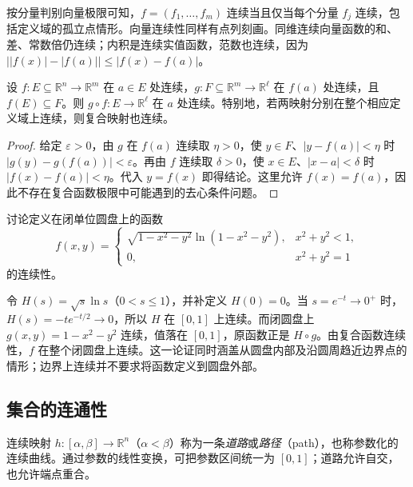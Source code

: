 按分量判别向量极限可知，$f=(f_1,\ldots,f_m)$ 连续当且仅当每个分量 $f_j$ 连续，包括定义域的孤立点情形。向量连续性同样有点列刻画。同维连续向量函数的和、差、常数倍仍连续；内积是连续实值函数，范数也连续，因为 $\bigl||f(x)|-|f(a)|\bigr|\leq|f(x)-f(a)|$。

\begin{theorem}[复合向量函数的连续性]
\label{thm:continuous-vector-function-composition}
设 $f:E\subseteq\mathbb R^n\to\mathbb R^m$ 在 $a\in E$ 处连续，$g:F\subseteq\mathbb R^m\to\mathbb R^\ell$ 在 $f(a)$ 处连续，且 $f(E)\subseteq F$。则 $g\circ f:E\to\mathbb R^\ell$ 在 $a$ 处连续。特别地，若两映射分别在整个相应定义域上连续，则复合映射也连续。
\end{theorem}

\begin{proof}
给定 $\varepsilon>0$，由 $g$ 在 $f(a)$ 连续取 $\eta>0$，使 $y\in F$、$|y-f(a)|<\eta$ 时 $|g(y)-g(f(a))|<\varepsilon$。再由 $f$ 连续取 $\delta>0$，使 $x\in E$、$|x-a|<\delta$ 时 $|f(x)-f(a)|<\eta$。代入 $y=f(x)$ 即得结论。这里允许 $f(x)=f(a)$，因此不存在复合函数极限中可能遇到的去心条件问题。
\end{proof}

\begin{example}
\label{ex:disk-logarithm-continuous-extension}
讨论定义在闭单位圆盘上的函数
\[
    f(x,y)=\begin{cases}
        \sqrt{1-x^2-y^2}\ln(1-x^2-y^2),&x^2+y^2<1,\\
        0,&x^2+y^2=1
    \end{cases}
\]
的连续性。
\end{example}

\begin{solve}
令 $H(s)=\sqrt s\ln s$（$0<s\leq1$），并补定义 $H(0)=0$。当 $s=e^{-t}\to0^+$ 时，$H(s)=-te^{-t/2}\to0$，所以 $H$ 在 $[0,1]$ 上连续。而闭圆盘上 $g(x,y)=1-x^2-y^2$ 连续，值落在 $[0,1]$，原函数正是 $H\circ g$。由复合函数连续性，$f$ 在整个闭圆盘上连续。这一论证同时涵盖从圆盘内部及沿圆周趋近边界点的情形；边界上连续并不要求将函数定义到圆盘外部。
\end{solve}

\subsection{集合的连通性}
\label{subsec:connectedness-of-sets}

连续映射 $h:[\alpha,\beta]\to\mathbb R^n$（$\alpha<\beta$）称为一条\emph{道路}或\emph{路径}（path），也称参数化的连续曲线。通过参数的线性变换，可把参数区间统一为 $[0,1]$；道路允许自交，也允许端点重合。

